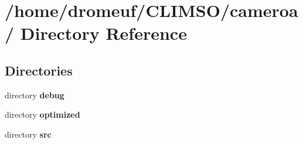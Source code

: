 \section{/home/dromeuf/CLIMSO/cameroa/ Directory Reference}
\label{dir_2ea96f9b97f359bceca3e6943f3fce72}
\subsection*{Directories}
\begin{CompactItemize}
\item 
directory {\bf debug}
\item 
directory {\bf optimized}
\item 
directory {\bf src}
\end{CompactItemize}
